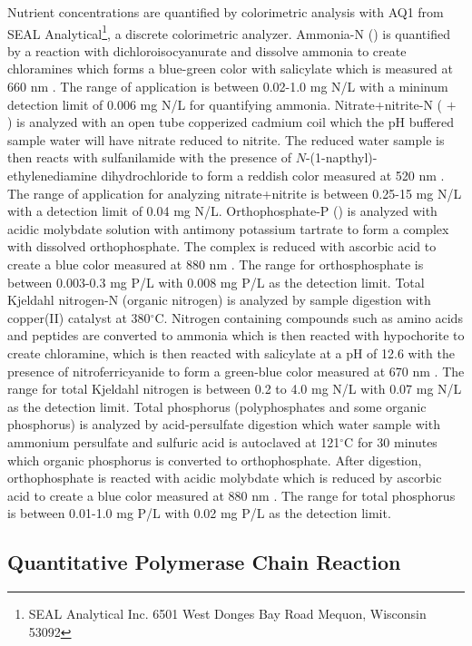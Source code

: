 Nutrient concentrations are quantified by colorimetric analysis with  AQ1 from SEAL Analytical\footnote{SEAL Analytical Inc.
6501 West Donges Bay Road Mequon, Wisconsin 53092}, a discrete colorimetric analyzer.  Ammonia-N () is quantified by a reaction with dichloroisocyanurate and dissolve ammonia to create chloramines which  forms a blue-green color with salicylate which is measured at 660 nm \cite{usepa_method_1993-2}. The range of application is between 0.02-1.0 mg N/L with a mininum detection limit of 0.006 mg N/L for quantifying ammonia.  Nitrate+nitrite-N ( $+$ ) is analyzed with an open tube copperized cadmium coil which the pH buffered sample water will have nitrate reduced to nitrite. The reduced water sample is then reacts with sulfanilamide with the presence of $N$-(1-napthyl)-ethylenediamine dihydrochloride to form a reddish color measured at 520 nm \cite{usepa_method_1993}. The range of application for analyzing nitrate+nitrite is between 0.25-15 mg N/L with a detection limit of 0.04 mg N/L.  Orthophosphate-P () is analyzed with acidic molybdate solution with antimony potassium tartrate to form a complex with dissolved orthophosphate. The complex is reduced with ascorbic acid to create a blue color measured at 880 nm \cite{usepa_method_1993-3}. The range for orthosphosphate is between 0.003-0.3 mg P/L with 0.008 mg P/L as the detection limit. Total Kjeldahl nitrogen-N (organic nitrogen) is analyzed by sample digestion with copper(II) catalyst at 380$^\circ$C. Nitrogen containing compounds such as amino acids and peptides are converted to ammonia which is then reacted with hypochorite to create chloramine, which is then reacted with salicylate at a pH of 12.6 with the presence of nitroferricyanide to form a green-blue color measured at 670 nm \cite{usepa_method_1993-1}. The range for total Kjeldahl nitrogen is between 0.2 to 4.0 mg N/L with 0.07 mg N/L as the detection limit. Total phosphorus (polyphosphates and some organic phosphorus)  is analyzed by acid-persulfate digestion which water sample with ammonium persulfate and sulfuric acid is autoclaved at 121$^\circ$C for 30 minutes which organic phosphorus is converted to orthophosphate. After digestion, orthophosphate is reacted with acidic molybdate which is reduced by ascorbic acid to create a blue color measured at 880 nm \cite{usepa_method_1993-3}. The range for total phosphorus is between 0.01-1.0 mg P/L with 0.02 mg P/L as the detection limit. 

\subsection{Quantitative Polymerase Chain Reaction}

